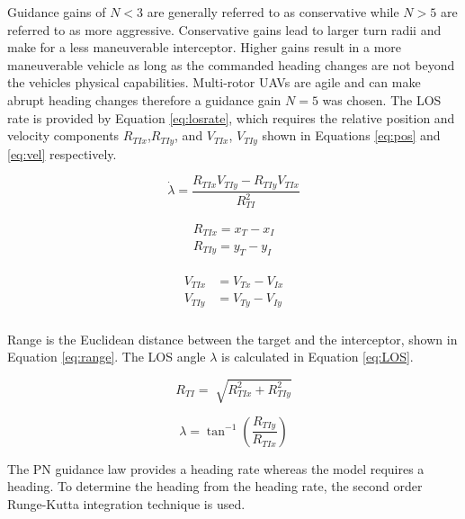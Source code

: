 \documentclass[]{aiaa-tc}%
\begin{document}
Guidance gains of $N < 3$ are generally referred to as conservative while $N > 5$ are referred to as more aggressive. Conservative gains lead to larger turn radii and make for a less maneuverable interceptor. Higher gains result in a more maneuverable vehicle as long as the commanded heading changes are not beyond the vehicles physical capabilities. Multi-rotor UAVs are agile and can make abrupt heading changes therefore a guidance gain $N = 5$ was chosen. The LOS rate is provided by Equation \ref{eq:losrate}, which requires the relative position and velocity components $R_{TIx}$,$R_{TIy}$, and $V_{TIx}$, $V_{TIy}$ shown in Equations \ref{eq:pos} and \ref{eq:vel} respectively. 

\begin{equation} \label{eq:losrate}
\dot{\lambda} = \frac{R_{TIx}V_{TIy}-R_{TIy}V_{TIx}}{R_{TI}^2}
\end{equation}

\begin{equation} \label{eq:pos}
\begin{split}
   R_{TIx} = x_T-x_I\\
   R_{TIy} = y_T-y_I
    \end{split}
\end{equation}

\begin{align}
\label{eq:vel}
\begin{split}
V_{TIx} &= V_{Tx}-V_{Ix}
\\
V_{TIy} &= V_{Ty}-V_{Iy}
\\
\end{split}
\end{align}

Range is the Euclidean distance between the target and the interceptor, shown in Equation \ref{eq:range}. The LOS angle $\lambda$ is calculated in Equation \ref{eq:LOS}. 

\begin{equation} \label{eq:range}
   R_{TI} =\sqrt[]{R_{TIx}^2+R_{TIy}^2}
\end{equation}

\begin{equation} \label{eq:LOS}
\lambda = \tan^{-1} \left(\frac{R_{TIy}}{R_{TIx}}\right)
\end{equation}

The PN guidance law provides a heading rate whereas the model requires a heading. To determine the heading from the heading rate, the second order Runge-Kutta integration technique is used. 
\end{document}
